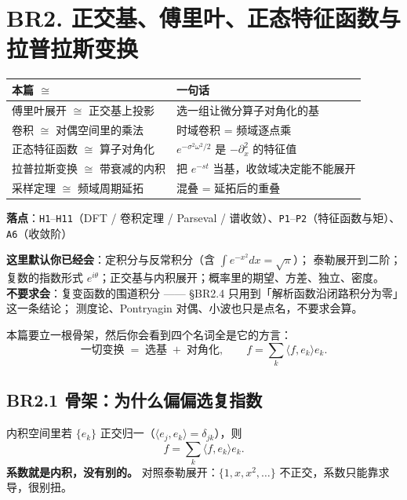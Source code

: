 \section{BR2. 正交基、傅里叶、正态特征函数与拉普拉斯变换}
\label{sec:br2}

\begin{center}
\small
\begin{tabular}{L{3.4cm}L{10.4cm}}
\toprule
\textbf{本篇 $\cong$} & \textbf{一句话} \\
\midrule
傅里叶展开 $\cong$ 正交基上投影 & 选一组让微分算子对角化的基 \\
卷积 $\cong$ 对偶空间里的乘法 & 时域卷积 = 频域逐点乘 \\
正态特征函数 $\cong$ 算子对角化 & $e^{-\sigma^2\omega^2/2}$ 是 $-\partial_x^2$ 的特征值 \\
拉普拉斯变换 $\cong$ 带衰减的内积 & 把 $e^{-st}$ 当基，收敛域决定能不能展开 \\
采样定理 $\cong$ 频域周期延拓 & 混叠 = 延拓后的重叠 \\
\bottomrule
\end{tabular}
\end{center}

\noindent\textbf{落点}：\texttt{H1}--\texttt{H11}（DFT / 卷积定理 / Parseval / 谱收敛）、\texttt{P1}--\texttt{P2}（特征函数与矩）、\texttt{A6}（收敛阶）

\noindent\small\textbf{这里默认你已经会}：定积分与反常积分（含 $\int e^{-x^2}dx=\sqrt{\pi}$）；
泰勒展开到二阶；复数的指数形式 $e^{i\theta}$；正交基与内积展开；概率里的期望、方差、独立、密度。\\
\textbf{不要求会}：复变函数的围道积分 —— \S BR2.4 只用到「解析函数沿闭路积分为零」这一条结论；
测度论、Pontryagin 对偶、小波也只是点名，不要求会算。\normalsize
\smallskip

本篇要立一根骨架，然后你会看到四个名词全是它的方言：
\[
\text{一切变换}\;=\;\text{选基}\;+\;\text{对角化},\qquad
f=\sum_k\langle f,e_k\rangle e_k .
\]

\subsection{BR2.1 骨架：为什么偏偏选复指数}

内积空间里若 $\{e_k\}$ 正交归一（$\langle e_j,e_k\rangle=\delta_{jk}$），则
\[
f=\sum_k\langle f,e_k\rangle e_k .
\]
\textbf{系数就是内积，没有别的。} 对照泰勒展开：$\{1,x,x^2,\dots\}$ 不正交，系数只能靠求导，很别扭。

